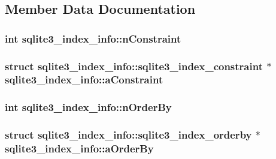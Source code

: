 \subsection{Member Data Documentation}
\hypertarget{structsqlite3__index__info_e861993a30ce914a5214eab2579d935a}{
\subsubsection[nConstraint]{\setlength{\rightskip}{0pt plus 5cm}int {\bf sqlite3\_\-index\_\-info::nConstraint}}}
\label{structsqlite3__index__info_e861993a30ce914a5214eab2579d935a}


\hypertarget{structsqlite3__index__info_634aa93834e2b47acf34454746c0f248}{
\subsubsection[aConstraint]{\setlength{\rightskip}{0pt plus 5cm}struct {\bf sqlite3\_\-index\_\-info::sqlite3\_\-index\_\-constraint} $\ast$ {\bf sqlite3\_\-index\_\-info::aConstraint}}}
\label{structsqlite3__index__info_634aa93834e2b47acf34454746c0f248}


\hypertarget{structsqlite3__index__info_3ef850fdc57eddbc8189fe84d0a9044e}{
\subsubsection[nOrderBy]{\setlength{\rightskip}{0pt plus 5cm}int {\bf sqlite3\_\-index\_\-info::nOrderBy}}}
\label{structsqlite3__index__info_3ef850fdc57eddbc8189fe84d0a9044e}


\hypertarget{structsqlite3__index__info_6823a68979e19d8e332389361e920ef9}{
\subsubsection[aOrderBy]{\setlength{\rightskip}{0pt plus 5cm}struct {\bf sqlite3\_\-index\_\-info::sqlite3\_\-index\_\-orderby} $\ast$ {\bf sqlite3\_\-index\_\-info::aOrderBy}}}
\label{structsqlite3__index__info_6823a68979e19d8e332389361e920ef9}


